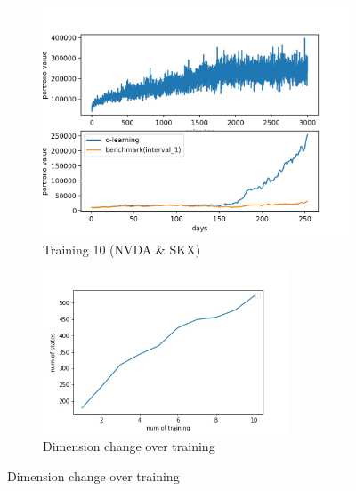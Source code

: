 \begin{figure}[H]
\begin{subfigure}{.5\textwidth}
\end{subfigure}%
\begin{subfigure}{.5\textwidth}
\centering
\includegraphics[clip, width=1.1\textwidth]{Graphics/q_learning_NS10.jpg} \caption{Training 10 (NVDA \& SKX)}
\end{subfigure}%
\vspace{0.1cm}
\begin{figure}
\begin{center}
\includegraphics[clip, width=0.8\textwidth]{Graphics/dimension.jpg} \caption{Dimension change over training}
\end{center}
\end{figure}
\end{figure}%

